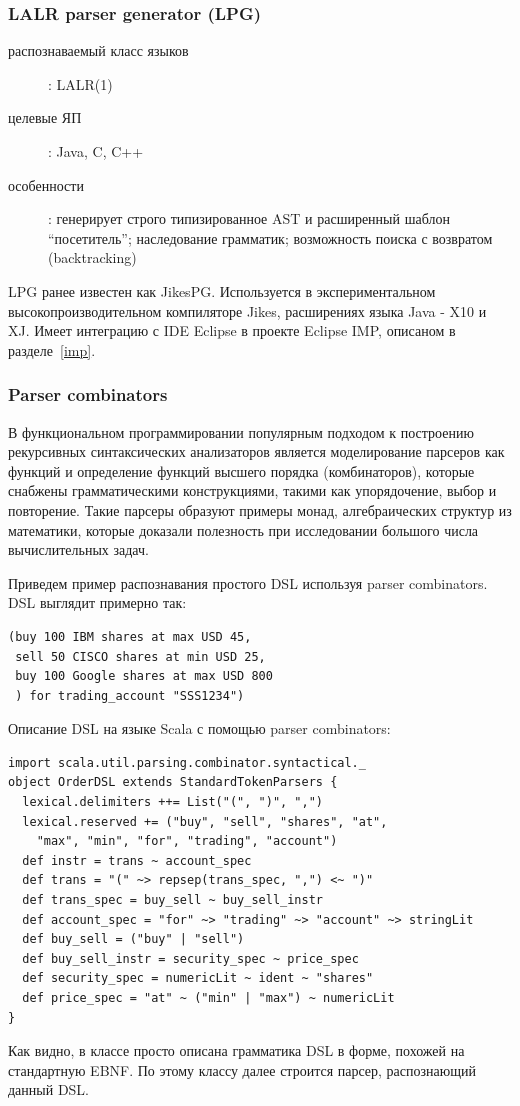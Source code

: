 \documentclass[a4paper,12pt,titlepage]{extarticle}
\begin{document}
\subsubsection*{LALR parser generator (LPG)}
\begin{description}
  \item[распознаваемый класс языков]: LALR(1)
  \item[целевые ЯП]: Java, C, C++
  \item[особенности]: генерирует строго типизированное AST и расширенный
 	шаблон ``посетитель''; наследование грамматик; возможность поиска с возвратом
 	(backtracking)
\end{description}

LPG ранее известен как JikesPG. Используется в экспериментальном
высокопроизводительном компиляторе Jikes, расширениях языка Java - X10 и XJ.
Имеет интеграцию с IDE Eclipse в проекте Eclipse IMP, описаном в разделе~\ref{imp}.

\subsubsection*{Parser combinators}
В функциональном программировании популярным подходом к построению рекурсивных
синтаксических анализаторов является моделирование парсеров как функций и
определение функций высшего порядка (комбинаторов), которые снабжены
грамматическими конструкциями, такими как упорядочение, выбор и повторение.
Такие парсеры образуют примеры монад, алгебраических структур из математики,
которые доказали полезность при исследовании большого числа вычислительных
задач.

Приведем пример распознавания простого DSL используя parser combinators.
DSL выглядит примерно так:
\begin{verbatim} 
(buy 100 IBM shares at max USD 45,
 sell 50 CISCO shares at min USD 25,
 buy 100 Google shares at max USD 800
 ) for trading_account "SSS1234")
\end{verbatim}
Описание DSL на языке Scala с помощью parser combinators:
\begin{verbatim} 
import scala.util.parsing.combinator.syntactical._
object OrderDSL extends StandardTokenParsers {
  lexical.delimiters ++= List("(", ")", ",")
  lexical.reserved += ("buy", "sell", "shares", "at", 
    "max", "min", "for", "trading", "account")
  def instr = trans ~ account_spec
  def trans = "(" ~> repsep(trans_spec, ",") <~ ")"
  def trans_spec = buy_sell ~ buy_sell_instr
  def account_spec = "for" ~> "trading" ~> "account" ~> stringLit
  def buy_sell = ("buy" | "sell")
  def buy_sell_instr = security_spec ~ price_spec
  def security_spec = numericLit ~ ident ~ "shares"
  def price_spec = "at" ~ ("min" | "max") ~ numericLit
}
\end{verbatim}
Как видно, в классе просто описана грамматика DSL в форме, похожей на
стандартную EBNF. По этому классу далее строится парсер, распознающий данный
DSL.
\end{document}
